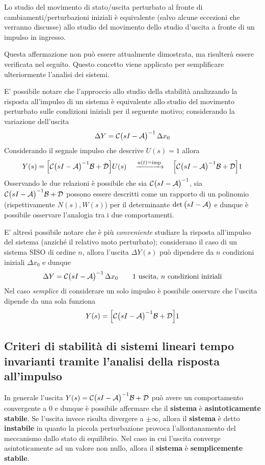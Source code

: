 		\begin{concetto}
			Lo studio del movimento di stato/uscita perturbato al fronte di cambiamenti/perturbazioni iniziali è equivalente (salvo alcune eccezioni che verranno discusse) allo studio del movimento dello studio d'uscita a fronte di un impulso in ingresso.
		\end{concetto}
		Questa affermazione non può essere attualmente dimostrata, ma risulterà essere verificata nel seguito. Questo concetto viene applicato per semplificare ulteriormente l'analisi dei sistemi.
		
		E' possibile notare che l'approccio allo studio della stabilità  analizzando la risposta all'impulso di un sistema è equivalente allo studio del movimento perturbato sulle condizioni iniziali per il seguente motivo; considerando la variazione dell'uscita
		\[ \Delta Y = \mathcal C \big(sI - \mathcal A\big)^{-1} \, \Delta x_0 \]
		Considerando il segnale impulso che descrive $U(s) = 1$ allora
		\[ Y(s) = \Big[ \mathcal C \big(sI - \mathcal A\big)^{-1} \mathcal B + \mathcal D \Big] U(s) \quad \xrightarrow{u(t) = \textrm{imp}} \quad \Big[ \mathcal C \big(sI - \mathcal A\big)^{-1} \mathcal B + \mathcal D \Big] 1 \]
		Osservando le due relazioni è possibile che sia  $ \mathcal C \big(sI - \mathcal A\big)^{-1}$, sia $\mathcal C \big(sI - \mathcal A\big)^{-1} \mathcal B + \mathcal D $ possono essere descritti come un rapporto di un polinomio (rispettivamente $N(s),W(s)$) per il determinante $\det \big(sI-\mathcal A\big)$ e dunque è possibile osservare l'analogia tra i due comportamenti.
		
		E' altresì possibile notare che è più \textit{conveniente} studiare la risposta all'impulso del sistema (anziché il relativo moto perturbato); considerano il caso di un sistema SISO di ordine $n$, allora l'uscita $\Delta Y(s)$ può dipendere da $n$ condizioni iniziali $\Delta x_0$ e dunque
		\[\Delta Y = \mathcal C \big(sI - \mathcal A\big)^{-1} \, \Delta x_0 \qquad \textrm{1 uscita, $n$ condizioni iniziali}\]
		Nel caso \textit{semplice} di considerare un solo impulso è possibile osservare che l'uscita dipende da una sola funziona
		\[ Y(s) =  \Big[ \mathcal C \big(sI - \mathcal A\big)^{-1} \mathcal B + \mathcal D \Big] 1 \]
		
		
	\subsection{Criteri di stabilità di sistemi lineari tempo invarianti tramite l'analisi della risposta all'impulso}
		In generale l'uscita  $Y(s) =  \mathcal C \big(sI - \mathcal A\big)^{-1} \mathcal B + \mathcal D $ può avere un comportamento convergente  a 0 e dunque è possibile affermare che il \textbf{sistema} è \textbf{asintoticamente stabile}. Se l'uscita invece risulta divergere a $\pm \infty$, allora il \textbf{sistema} è detto \textbf{instabile} in quanto la piccola perturbazione provoca l'allontanamento del meccanismo dallo stato di equilibrio. Nel caso in cui l'uscita converge asintoticamente ad un valore non nullo, allora il \textbf{sistema} è \textbf{semplicemente stabile}.
		
